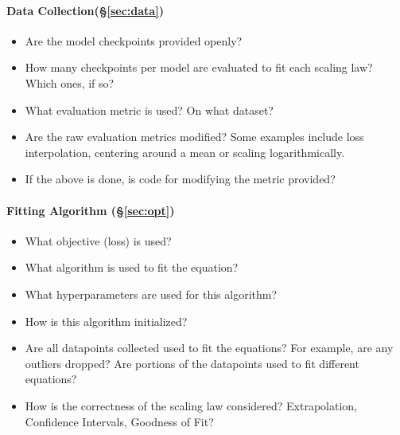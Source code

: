 {\begin{minipage}{38em}
\begin{minipage}[t]{0.9\textwidth}
\raggedright


\paragraph{Data Collection(\S\ref{sec:data})}
\begin{itemize}[leftmargin=*]
    \item Are the model checkpoints provided openly?
    \item How many checkpoints per model are evaluated to fit each scaling law? Which ones, if so?
    \item What evaluation metric is used? On what dataset?
    \item Are the raw evaluation metrics modified? Some examples include loss interpolation, centering around a mean or scaling logarithmically.
    \item If the above is done, is code for modifying the metric provided? 
\end{itemize}

\paragraph{Fitting Algorithm (\S\ref{sec:opt})}
\begin{itemize}[leftmargin=*]
    \item What objective (loss) is used?
    \item What algorithm is used to fit the equation?
    \item What hyperparameters are used for this algorithm?
    \item How is this algorithm initialized?
    \item Are all datapoints collected used to fit the equations? For example, are any outliers dropped? Are portions of the datapoints used to fit different equations?
    \item How is the correctness of the scaling law considered? Extrapolation, Confidence Intervals, Goodness of Fit?
\end{itemize}

\end{minipage}


\end{minipage}}